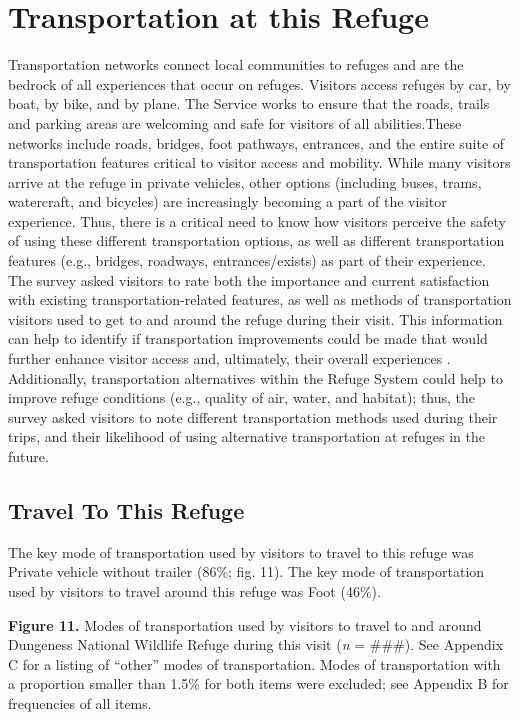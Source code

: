 \documentclass[]{book}
\let\BeginKnitrBlock\begin \let\EndKnitrBlock\end
\begin{document}
\chapter{Transportation at this Refuge}\label{trans}

\BeginKnitrBlock{heading4}
Transportation networks connect local communities to refuges and are the
bedrock of all experiences that occur on refuges. Visitors access
refuges by car, by boat, by bike, and by plane. The Service works to
ensure that the roads, trails and parking areas are welcoming and safe
for visitors of all abilities.These networks include roads, bridges,
foot pathways, entrances, and the entire suite of transportation
features critical to visitor access and mobility. While many visitors
arrive at the refuge in private vehicles, other options (including
buses, trams, watercraft, and bicycles) are increasingly becoming a part
of the visitor experience. Thus, there is a critical need to know how
visitors perceive the safety of using these different transportation
options, as well as different transportation features (e.g., bridges,
roadways, entrances/exists) as part of their experience. The survey
asked visitors to rate both the importance and current satisfaction with
existing transportation-related features, as well as methods of
transportation visitors used to get to and around the refuge during
their visit. This information can help to identify if transportation
improvements could be made that would further enhance visitor access
and, ultimately, their overall experiences \citep{USFWS2011}.
Additionally, transportation alternatives within the Refuge System
\citep{krechmer2001, volpe2010} could help to improve refuge conditions
(e.g., quality of air, water, and habitat); thus, the survey asked
visitors to note different transportation methods used during their
trips, and their likelihood of using alternative transportation at
refuges in the future.
\EndKnitrBlock{heading4}

\section*{Travel To This Refuge}\label{travel-to-this-refuge-1}

The key mode of transportation used by visitors to travel to this refuge
was Private vehicle without trailer (86\%; fig. 11). The key mode of
transportation used by visitors to travel around this refuge was Foot
(46\%).

\textbf{Figure 11.} Modes of transportation used by visitors to travel
to and around Dungeness National Wildlife Refuge during this visit
(\emph{n} = \#\#\#). See Appendix C for a listing of ``other'' modes of
transportation. Modes of transportation with a proportion smaller than
1.5\% for both items were excluded; see Appendix B for frequencies of
all items.
\end{document}
